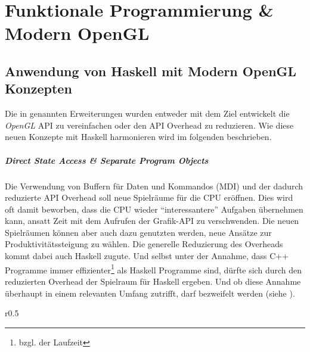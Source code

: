 \chapter{Funktionale Programmierung \& Modern OpenGL}
\label{chap:haskell-modern-gl}

\begingroup
\section{Anwendung von Haskell mit Modern OpenGL Konzepten}\label{sec:haskell-gl-anwendung}

Die in  genannten Erweiterungen wurden entweder mit dem Ziel entwickelt die \textit{OpenGL} \ac{API} zu vereinfachen oder den \ac{API} Overhead zu reduzieren. Wie diese neuen Konzepte mit Haskell harmonieren wird im folgenden beschrieben.

\paragraph{Direct State Access \& Separate Program Objects} Die Verwendung von Buffern für Daten und Kommandos (\ac{MDI}) und der dadurch reduzierte API Overhead soll neue Spielräume für die CPU eröffnen. Dies wird oft damit beworben, dass die CPU wieder "`interessantere"' Aufgaben übernehmen kann, ansatt Zeit mit dem Aufrufen der Grafik-\ac{API} zu verschwenden. Die neuen Spielräumen können aber auch dazu genutzten werden, neue Ansätze zur Produktivitätssteigung zu wählen. Die generelle Reduzierung des Overheads kommt dabei auch Haskell zugute. Und selbst unter der Annahme, dass C++ Programme immer effizienter\footnote{bzgl. der Laufzeit} als Haskell Programme sind, dürfte sich durch den reduzierten Overhead der Spielraum für Haskell ergeben. Und ob diese Annahme überhaupt in einem relevanten Umfang zutrifft, darf bezweifelt werden (siehe ).

\begin{wrapfigure}{r}{0.5\linewidth}
\centering
{}
\end{wrapfigure}

